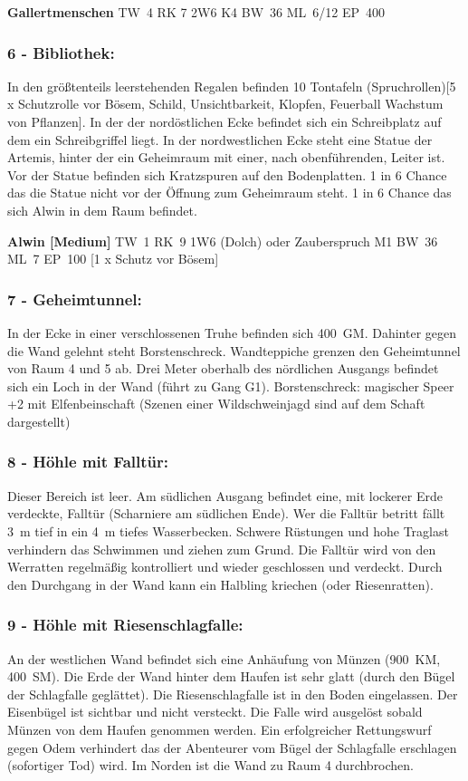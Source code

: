 \textbf{Gallertmenschen} TW~4 RK 7 2W6 K4 BW~36 ML~6/12 EP~400

\subsubsection{6 - Bibliothek:} In den größtenteils leerstehenden Regalen befinden
10 Tontafeln (Spruchrollen)[5 x Schutzrolle vor Bösem, Schild,
Unsichtbarkeit, Klopfen, Feuerball Wachstum von Pflanzen]. In der
der nordöstlichen Ecke befindet sich ein Schreibplatz auf dem ein
Schreibgriffel liegt. In der nordwestlichen Ecke steht eine Statue der
Artemis, hinter der ein Geheimraum mit einer, nach obenführenden, Leiter
ist. Vor der Statue befinden sich Kratzspuren auf den Bodenplatten. 1 in
6 Chance das die Statue nicht vor der Öffnung zum Geheimraum steht. 1
in 6 Chance das sich Alwin in dem Raum befindet.  

\textbf{Alwin [Medium]} TW~1 RK~9
1W6 (Dolch) oder Zauberspruch M1 BW~36 ML~7 EP~100 [1 x Schutz vor Bösem]
 

\subsubsection{7 - Geheimtunnel:} In der Ecke in einer verschlossenen Truhe befinden sich
400~GM. Dahinter gegen die Wand gelehnt steht Borstenschreck. Wandteppiche
grenzen den Geheimtunnel von Raum 4 und 5 ab. Drei Meter oberhalb des nördlichen
Ausgangs befindet sich ein Loch in der Wand (führt zu Gang G1).
Borstenschreck: magischer Speer +2 mit Elfenbeinschaft (Szenen einer
Wildschweinjagd sind auf dem Schaft dargestellt)

\subsubsection{8 - Höhle mit Falltür:} Dieser Bereich ist leer. Am südlichen Ausgang
befindet eine, mit lockerer Erde verdeckte, Falltür (Scharniere am
südlichen Ende). Wer die Falltür betritt fällt 3~m tief in ein 4~m
tiefes Wasserbecken. Schwere Rüstungen und hohe Traglast verhindern das
Schwimmen und ziehen zum Grund.  Die Falltür wird von den Werratten
regelmäßig kontrolliert und wieder geschlossen und verdeckt. Durch
den Durchgang in der Wand kann ein Halbling kriechen (oder Riesenratten).

\subsubsection{9 - Höhle mit Riesenschlagfalle:} An der westlichen Wand befindet sich
eine Anhäufung von Münzen (900~KM, 400~SM). Die Erde der Wand hinter dem
Haufen ist sehr glatt (durch den Bügel der Schlagfalle geglättet). Die
Riesenschlagfalle ist in den Boden eingelassen. Der Eisenbügel ist
sichtbar und nicht versteckt. Die Falle wird ausgelöst sobald Münzen
von dem Haufen genommen werden. Ein erfolgreicher Rettungswurf gegen
Odem verhindert das der Abenteurer vom Bügel der Schlagfalle erschlagen
(sofortiger Tod) wird. Im Norden ist die Wand zu Raum 4 durchbrochen.

